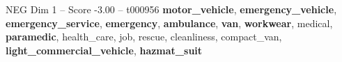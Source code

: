 \begin{textsample}{NEG Dim 1 – Score -3.00 – t000956}  \label{ex:f1_neg_039}
\textbf{motor\_vehicle}, \textbf{emergency\_vehicle}, \textbf{emergency\_service}, \textbf{emergency}, \textbf{ambulance}, \textbf{van}, \textbf{workwear}, medical, \textbf{paramedic}, health\_care, job, rescue, cleanliness, compact\_van, \textbf{light\_commercial\_vehicle}, \textbf{hazmat\_suit}

\end{textsample}
